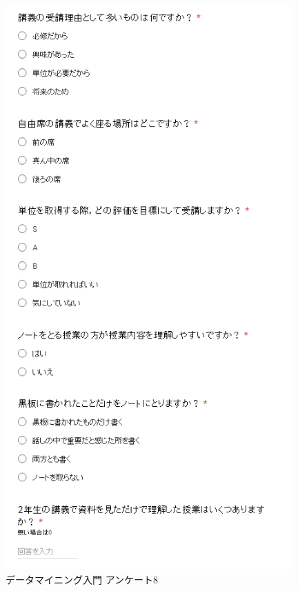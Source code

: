\begin{figure}[p]
\centering
\includegraphics[width=11cm]{forms8.PNG}
\caption{データマイニング入門 アンケート8}\label{サンプル図}
\end{figure}

